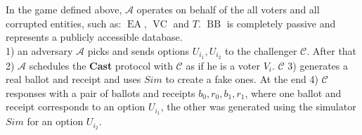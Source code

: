 \documentclass[12pt]{article}
\DeclareMathOperator{\ea}{EA}
\DeclareMathOperator{\bb}{BB}
\DeclareMathOperator{\voc}{VC}
\begin{document}
In the game defined above, $\mathcal{A}$ operates on behalf of the all voters and all corrupted entities, such as:  $\ea$, $\voc$ and $T$. $\bb$ is completely passive and represents a publicly accessible database.\\
1) an adversary $\mathcal{A}$ picks and sends options $U_{i_1}, U_{i_2}$ to the challenger $\mathcal{C}$.  After that 2) $\mathcal{A}$ schedules the \textbf{Cast} protocol with $\mathcal{C}$  as if he is a voter $V_i$. $\mathcal{C}$ 3) generates a real ballot and receipt and uses $Sim$ to create a fake ones.  At the end 4) $\mathcal{C}$ responses with a pair of ballots and receipts $b_0,r_0,b_1,r_1$, where one ballot and receipt corresponds to an option $U_{i_1}$, the other was generated using the simulator $Sim$ for an option $U_{i_2}$. \\\\
 
\end{document}
